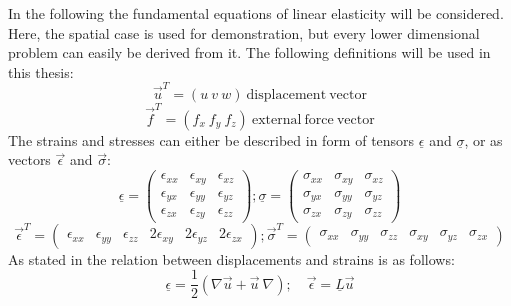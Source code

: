  In the following the fundamental equations of linear elasticity will be considered. Here, the spatial case is used for demonstration, but every lower dimensional problem can easily be derived from it.
 The following definitions will be used in this thesis:
 \begin{equation}
 \vec{u}^T = \left(u\ v\ w\right)\ \mathrm{displacement\ vector}
 \end{equation}
 \begin{equation}
 \vec{f}^T = \left(f_x\ f_y\ f_z\right)\ \mathrm{external\ force\ vector}
 \end{equation}
 The strains and stresses can either be described in form of tensors $\underline{\epsilon}$ and $\underline{\sigma}$, or as vectors $\vec{\epsilon}$ and $\vec{\sigma}$:
 \begin{equation}
 \underline{\epsilon} = \begin{pmatrix}
 \epsilon_{xx} & \epsilon_{xy} & \epsilon_{xz} \\
 \epsilon_{yx} & \epsilon_{yy} & \epsilon_{yz} \\
 \epsilon_{zx} & \epsilon_{zy} & \epsilon_{zz} \end{pmatrix};
 \underline{\sigma} = \begin{pmatrix}
 \sigma_{xx} & \sigma_{xy} & \sigma_{xz} \\
 \sigma_{yx} & \sigma_{yy} & \sigma_{yz} \\
 \sigma_{zx} & \sigma_{zy} & \sigma_{zz} \end{pmatrix}
 \end{equation}
 \begin{equation}
 \vec{\epsilon}^T = \begin{pmatrix}
 \epsilon_{xx} & \epsilon_{yy} & \epsilon_{zz} & 2\epsilon_{xy} & 2\epsilon_{yz} & 2\epsilon_{zx} \end{pmatrix};
 \vec{\sigma}^T = \begin{pmatrix}
 \sigma_{xx} & \sigma_{yy} & \sigma_{zz} & \sigma_{xy} & \sigma_{yz} & \sigma_{zx} \end{pmatrix}
 \end{equation}
 As stated in \cite{steinke2005finite} the relation between displacements and strains is as follows:
 \begin{equation}\label{eq:displ_strain_relation}
 \underline{\epsilon} = \frac{1}{2}\left(\nabla\vec{u} + \vec{u}\:\nabla \right);\quad \vec{\epsilon}
 = \underline{L}\vec{u}
 \end{equation}
